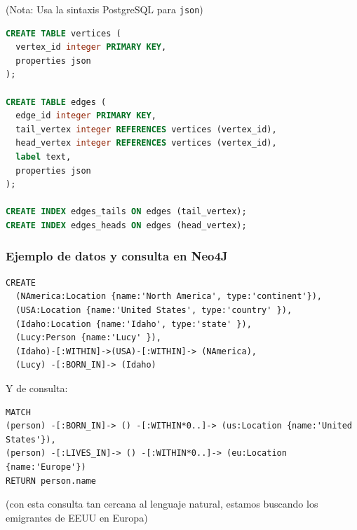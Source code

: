 \documentclass[14pt]{beamer}
\begin{document}
\begin{frame}
(Nota: Usa la sintaxis PostgreSQL para {\tt json})
\begin{lstlisting}[language=SQL]
CREATE TABLE vertices (
  vertex_id integer PRIMARY KEY,
  properties json
);

CREATE TABLE edges (
  edge_id integer PRIMARY KEY,
  tail_vertex integer REFERENCES vertices (vertex_id),
  head_vertex integer REFERENCES vertices (vertex_id),
  label text,
  properties json
);

CREATE INDEX edges_tails ON edges (tail_vertex);
CREATE INDEX edges_heads ON edges (head_vertex);
\end{lstlisting}
\end{frame}

\begin{frame}
  \frametitle{Ejemplo de datos y consulta en Neo4J}
\begin{block}{}
\begin{lstlisting}
CREATE
  (NAmerica:Location {name:'North America', type:'continent'}),
  (USA:Location {name:'United States', type:'country' }),
  (Idaho:Location {name:'Idaho', type:'state' }),
  (Lucy:Person {name:'Lucy' }),
  (Idaho)-[:WITHIN]->(USA)-[:WITHIN]-> (NAmerica),
  (Lucy) -[:BORN_IN]-> (Idaho)
\end{lstlisting}
\end{block}

\framebreak

Y de consulta:
\begin{block}{}
\begin{lstlisting}
MATCH
(person) -[:BORN_IN]-> () -[:WITHIN*0..]-> (us:Location {name:'United States'}),
(person) -[:LIVES_IN]-> () -[:WITHIN*0..]-> (eu:Location {name:'Europe'})
RETURN person.name
\end{lstlisting}
\end{block}

(con esta consulta tan cercana al lenguaje natural, estamos buscando los
emigrantes de EEUU en Europa)

\end{frame}
\end{document}
